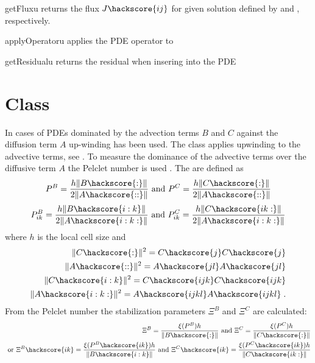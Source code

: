 \begin{methoddesc}[LinearPDE]{getFlux}{u}
returns the flux $J\hackscore{ij}$  for given solution 
defined by  and , respectively.
\end{methoddesc}

\begin{methoddesc}[LinearPDE]{applyOperator}{u}
applies the PDE operator to 
\end{methoddesc}

\begin{methoddesc}[LinearPDE]{getResidual}{u}
returns the residual when insering  into the PDE
\end{methoddesc}

\section{\AdvectivePDE Class}
In cases of PDEs dominated by the advection terms $B$ and $C$ against the diffusion term $A$
up-winding has been used. 
The \AdvectivePDE class applies upwinding to the advective terms, see . 
To measure the dominance of the advective terms over the diffusive term $A$ the 
Pelclet number is used . The are defined as
\begin{eqnarray}\label{LINEARPDE.Peclet.single}
P^{B}=\frac{h\|B\hackscore{:}\|}{2\|A\hackscore{::}\|}
\mbox{ and }
P^{C}=\frac{h\|C\hackscore{:}\|}{2\|A\hackscore{::}\|}
\end{eqnarray}
\begin{eqnarray}\label{LINEARPDE.Peclet.system}
P^{B}_{ik}=\frac{h\|B\hackscore{i:k}\|}{2\|A\hackscore{i:k:}\|}
\mbox{ and }
P^{C}_{ik}=\frac{h\|C\hackscore{ik:}\|}{2\|A\hackscore{i:k:}\|}
\end{eqnarray}
where $h$ is the local cell size and
\begin{eqnarray}\label{LINEARPDE.ADVECTIVE.1b}
\|C\hackscore{:}\|^2=C\hackscore{j}C\hackscore{j} \\
\|A\hackscore{::}\|^2=A\hackscore{jl}A\hackscore{jl} \\
\|C\hackscore{i:k}\|^2=C\hackscore{ijk}C\hackscore{ijk} \\
\|A\hackscore{i:k:}\|^2=A\hackscore{ijkl}A\hackscore{ijkl} \; .
\end{eqnarray}
From the Pelclet number the stabilization parameters $\Xi^{B}$ and $\Xi^{C}$ are calculated:
\begin{eqnarray}\label{LINEARPDE.Peclet.2}
\Xi^{B}=\frac{\xi(P^{B}) h}{\|B\hackscore{:}\|}
\mbox{ and }
\Xi^{C}=\frac{\xi(P^{C}) h}{\|C\hackscore{:}\|} \\
\mbox{ or }
\Xi^{B}\hackscore{ik}=\frac{\xi(P^{B}\hackscore{ik}) h}{\|B\hackscore{i:k}\|}
\mbox{ and }
\Xi^{C}\hackscore{ik}=\frac{\xi(P^{C}\hackscore{ik}) h}{\|C\hackscore{ik:}\|}
\end{eqnarray}
